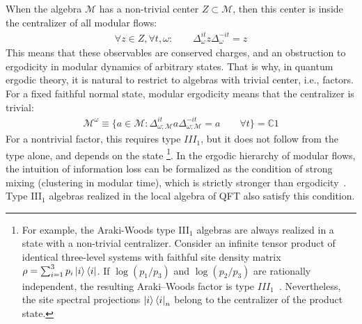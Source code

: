 \documentclass[a4paper,11pt]{article}
\newtheorem{lemma}[theorem]{Lemma}
\theoremstyle{definition}
\newcommand{\mM}{\mathcal{M}}
\begin{document}
When the algebra $\mM$ has a non-trivial center $Z\subset \mM$, then this center is inside the centralizer of all modular flows:
\begin{align}
    \forall z\in Z,\forall t,\omega:\qquad \Delta_{\omega}^{it}z \Delta_\omega^{-it}=z
\end{align}
This means that these observables are conserved charges, and an obstruction to ergodicity in modular dynamics of arbitrary states. That is why, in quantum ergodic theory, it is natural to restrict to algebras with trivial center, i.e., factors. For a fixed faithful normal state, modular ergodicity means that the centralizer is trivial:
\begin{align}
    \label{eq:modular-ergodicity}
    \mM^\omega\equiv \{a\in \mM:\Delta_{\omega;\mM}^{it}a\Delta_{\omega;\mM}^{-it}=a\qquad \forall t\}=\mathbb{C} 1
\end{align}
For a nontrivial factor, this requires type $III_1$, but it does not follow from the
type alone, and depends on the state \footnote{For example, the Araki-Woods type III$_1$ algebras are always realized in a state with a non-trivial centralizer. Consider an infinite tensor product of identical three-level
systems with faithful site density matrix
$\rho=\sum_{i=1}^3p_i\ket{i}\bra{i}$.
If $\log(p_1/p_3)$ and $\log(p_2/p_3)$ are rationally independent, the resulting
Araki--Woods factor is type $III_1$~\cite{ArakiWoods1968}.
Nevertheless, the site spectral projections $\ket{i}\bra{i}_n$ belong to the
centralizer of the product state.}. In the ergodic hierarchy of modular flows, the intuition of information loss can be formalized as the condition of strong mixing (clustering in modular time), which is strictly stronger than ergodicity~\cite{furuya2023information}. Type III$_1$ algebras realized in the local algebra of QFT also satisfy this condition.

\end{document}
